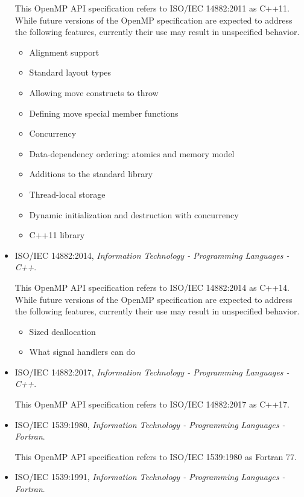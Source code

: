 \begin{itemize}
This OpenMP API specification refers to ISO/IEC 14882:2011 as C++11. 
While future versions of the OpenMP specification are expected to
address the following features, currently their use may result in
unspecified behavior.

\begin{itemize}
\item Alignment support
\item Standard layout types
\item Allowing move constructs to throw
\item Defining move special member functions
\item Concurrency
\item Data-dependency ordering: atomics and memory model
\item Additions to the standard library
\item Thread-local storage
\item Dynamic initialization and destruction with concurrency
\item C++11 library
\end{itemize}

\item ISO/IEC 14882:2014, \textsl{Information Technology - Programming Languages - C++}.

This OpenMP API specification refers to ISO/IEC 14882:2014 as C++14. 
While future versions of the OpenMP specification are expected to
address the following features, currently their use may result in
unspecified behavior.

\begin{itemize}
\item Sized deallocation
\item What signal handlers can do
\end{itemize}

\item ISO/IEC 14882:2017, \textsl{Information Technology - Programming Languages - C++}.

This OpenMP API specification refers to ISO/IEC 14882:2017 as
C++17. 

\item ISO/IEC 1539:1980, \textsl{Information Technology - Programming Languages - Fortran}.

This OpenMP API specification refers to ISO/IEC 1539:1980 as Fortran 77.

\item ISO/IEC 1539:1991, \textsl{Information Technology - Programming Languages - Fortran}.


\end{itemize}
